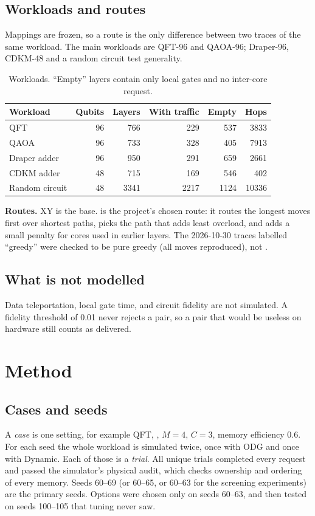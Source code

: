 \documentclass[11pt,a4paper]{report}
\newcommand{\code}[1]{\texttt{\detokenize{#1}}}
\begin{document}
\section{Workloads and routes}
Mappings are frozen, so a route is the only difference between two traces of the same workload. The main workloads are QFT-96 and QAOA-96; Draper-96, CDKM-48 and a random circuit test generality.
\begin{table}[htbp]\centering\small
\begin{tabular}{@{}lrrrrr@{}}\toprule
Workload & Qubits & Layers & With traffic & Empty & Hops \\\midrule
QFT & 96 & 766 & 229 & 537 & 3833 \\ QAOA & 96 & 733 & 328 & 405 & 7913 \\ Draper adder & 96 & 950 & 291 & 659 & 2661 \\
CDKM adder & 48 & 715 & 169 & 546 & 402 \\ Random circuit & 48 & 3341 & 2217 & 1124 & 10336 \\\bottomrule
\end{tabular}\caption{Workloads. ``Empty'' layers contain only local gates and no inter-core request.}
\end{table}
\textbf{Routes.} XY is the base. \code{history} is the project's chosen route: it routes the longest moves first over shortest paths, picks the path that adds least overload, and adds a small penalty for cores used in earlier layers. The 2026-10-30 traces labelled ``greedy'' were checked to be pure greedy (all moves reproduced), not \code{history}.

\section{What is not modelled}
Data teleportation, local gate time, and circuit fidelity are not simulated. A fidelity threshold of 0.01 never rejects a pair, so a pair that would be useless on hardware still counts as delivered.

\chapter{Method}
\section{Cases and seeds}
A \emph{case} is one setting, for example QFT, \code{history}, $M=4$, $C=3$, memory efficiency 0.6. For each seed the whole workload is simulated twice, once with ODG and once with Dynamic. Each of those is a \emph{trial}. All \TotalTrials{} unique trials completed every request and passed the simulator's physical audit, which checks ownership and ordering of every memory. Seeds 60--69 (or 60--65, or 60--63 for the screening experiments) are the primary seeds. Options were chosen only on seeds 60--63, and then tested on seeds 100--105 that tuning never saw.
\end{document}
